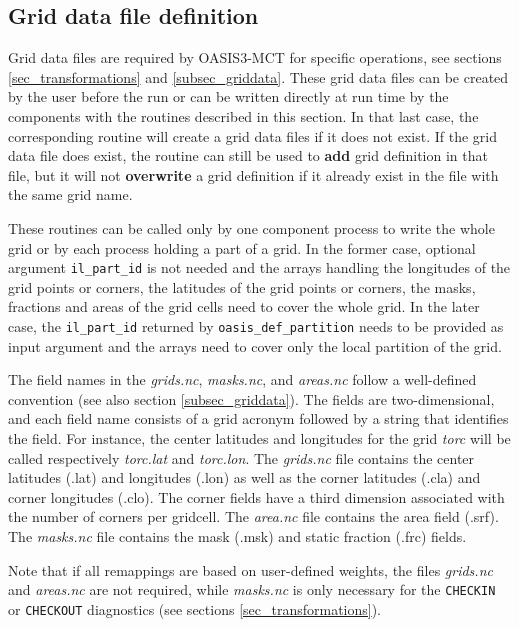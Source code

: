 \subsection{Grid data file definition}
\label{subsubsec_griddef}

Grid data files are required by OASIS3-MCT for specific
operations, see sections \ref{sec_transformations} and \ref{subsec_griddata}.
These grid data files can be created by the
user before the run or can be written directly at run time by the components with the routines described in this section.
In that last case, the corresponding routine will create a grid data files if it does not exist. If the grid data file does exist, the routine can still be used to {\bf add} grid definition in that file, but it will not {\bf overwrite} a grid definition if it already exist in the file with the same grid name.

These routines can be called only by one component process to write the whole grid or by each process holding a part of a grid. In the former case, optional argument {\tt il\_part\_id} is not needed and the arrays handling the longitudes of the grid points or corners, the latitudes of the grid points or corners, the masks, fractions and areas of the grid cells need to cover the whole grid. In the later case, the {\tt il\_part\_id} returned by {\tt oasis\_def\_partition} needs to be provided as input argument and the arrays need to cover only the local partition of the grid. 

The field names in the {\em grids.nc}, {\em masks.nc}, and {\em
  areas.nc} follow a well-defined convention (see also section \ref{subsec_griddata}).  The fields are
two-dimensional, and each field name consists of a grid acronym followed by a string that identifies the field.  For instance, the center latitudes and longitudes for the grid {\it torc} will be called respectively {\it torc.lat} and {\it torc.lon}.  The {\em grids.nc} file contains the center latitudes (.lat) and longitudes (.lon) as well as the corner latitudes (.cla) and corner longitudes (.clo).  The corner fields have a third dimension associated with the number of corners per gridcell.  The {\em area.nc} file contains the area field (.srf).  The {\em masks.nc} file contains the mask (.msk) and static fraction (.frc) fields.

Note that if all remappings are based on user-defined weights, the files {\em grids.nc} and {\em
  areas.nc}  are not required, while {\em masks.nc} is only
necessary for the {\tt CHECKIN} or {\tt CHECKOUT} diagnostics (see sections \ref{sec_transformations}).

